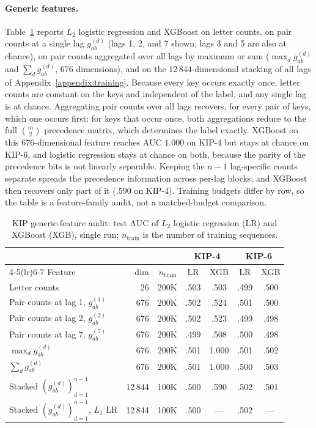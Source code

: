 \documentclass{article} %
\theoremstyle{plain}
\theoremstyle{definition}
\theoremstyle{remark}
\begin{document}
\paragraph{Generic features.}
Table~\ref{tab:kip_features} reports $L_2$ logistic regression and XGBoost on letter counts, on pair counts at a single lag $g_{ab}^{(d)}$ (lags 1, 2, and 7 shown; lags 3 and 5 are also at chance), on pair counts aggregated over all lags by maximum or sum ($\max_d g_{ab}^{(d)}$ and $\sum_d g_{ab}^{(d)}$, 676 dimensions), and on the $12\,844$-dimensional stacking of all lags of Appendix~\ref{appendix:training}. Because every key occurs exactly once, letter counts are constant on the keys and independent of the label, and any single lag is at chance. Aggregating pair counts over all lags recovers, for every pair of keys, which one occurs first: for keys that occur once, both aggregations reduce to the full $\binom{m}{2}$ precedence matrix, which determines the label exactly. XGBoost on this 676-dimensional feature reaches AUC $1.000$ on KIP-4 but stays at chance on KIP-6, and logistic regression stays at chance on both, because the parity of the precedence bits is not linearly separable. Keeping the $n-1$ lag-specific counts separate spreads the precedence information across per-lag blocks, and XGBoost then recovers only part of it ($.590$ on KIP-4). Training budgets differ by row, so the table is a feature-family audit, not a matched-budget comparison.

\begin{table}[h]
\centering\small
\caption{KIP generic-feature audit: test AUC of $L_2$ logistic regression (LR) and XGBoost (XGB), single run; $n_{\text{train}}$ is the number of training sequences.}
\label{tab:kip_features}
\begin{tabular}{@{}lrrcccc@{}}
\toprule
 & & & \multicolumn{2}{c}{KIP-4} & \multicolumn{2}{c}{KIP-6} \\
\cmidrule(lr){4-5}\cmidrule(lr){6-7}
Feature & dim & $n_{\text{train}}$ & LR & XGB & LR & XGB \\
\midrule
Letter counts & 26 & 200K & .503 & .503 & .499 & .500 \\
Pair counts at lag 1, $g_{ab}^{(1)}$ & 676 & 200K & .502 & .524 & .501 & .500 \\
Pair counts at lag 2, $g_{ab}^{(2)}$ & 676 & 200K & .502 & .523 & .499 & .498 \\
Pair counts at lag 7, $g_{ab}^{(7)}$ & 676 & 200K & .499 & .508 & .500 & .498 \\
$\max_d g_{ab}^{(d)}$ & 676 & 200K & .501 & 1.000 & .501 & .502 \\
$\sum_d g_{ab}^{(d)}$ & 676 & 200K & .501 & 1.000 & .500 & .503 \\
Stacked $(g_{ab}^{(d)})_{d=1}^{n-1}$ & 12\,844 & 100K & .500 & .590 & .502 & .501 \\
Stacked $(g_{ab}^{(d)})_{d=1}^{n-1}$, $L_1$ LR & 12\,844 & 100K & .500 & --- & .502 & --- \\
\bottomrule
\end{tabular}
\end{table}
\end{document}
